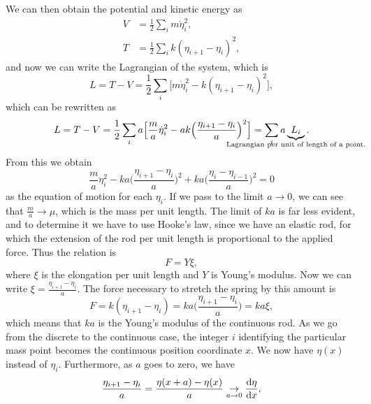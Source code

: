 \documentclass{article}
\begin{document}
We can then obtain the potential and kinetic energy as
\begin{subequations}
    \begin{align}
        V &= \frac{1}{2}\sum_i m\dot{\eta}_i^2,\\
        T & = \frac{1}{2}\sum_i k(\eta_{i+1} - \eta_i)^2,
    \end{align}
\end{subequations}
and now we can write the Lagrangian of the system, which is
\begin{equation*}
    L = T - V = \frac{1}{2} \sum_i  \Big[ m \dot{\eta}_i^2 - k(\eta_{i+1} - \eta_i)^2\Big],
\end{equation*}
which can be rewritten as
\begin{equation}
    L = T - V = \frac{1}{2} \sum_i a\Big[ \frac{m}{a}\dot{\eta}_i^2 - ak\Big(\frac{\eta_{i+1} - \eta_i}{a}\Big)^2 \Big] = \sum_i a\underbrace{L_i}_{\mathclap{\text{Lagrangian per unit of length of a point.}}}.
\end{equation}
From this we obtain
\begin{equation*}
    \frac{m}{a} \ddot{\eta}_i^2 -ka \Big(\frac{\eta_{i+1} - \eta_i}{a}\Big)^2 + ka \Big(\frac{\eta_{i} - \eta_{i-1}}{a}\Big)^2 =0
\end{equation*}
as the equation of motion for each $\eta_i$.
If we pass to the limit $a\rightarrow 0$, we can see that $\frac{m}{a}\rightarrow \mu$, which is the mass per unit length.
The limit of $ka$ is far less evident, and to determine it we have to use Hooke's law, since we have an elastic rod,
for which the extension of the rod per unit length is proportional to the applied force. Thus the relation is
\begin{equation}
    F= Y \xi,
\end{equation}
where $\xi$ is the elongation per unit length and $Y$ is Young's modulus. Now we can write $\xi = \frac{\eta_{i+1} - \eta_i}{a}$. The force necessary to
stretch the spring by this amount is
\begin{equation*}
    F = k(\eta_{i+1} - \eta_i) = ka \Big(\frac{\eta_{i+1} - \eta_i}{a}\Big) = ka \xi,
\end{equation*}
which means that $ka$ is the Young's modulus of the continuous rod. As we go from the discrete to the continuous case, the integer $i$ identifying 
the particular mass point becomes the continuous position coordinate $x$. We now have $\eta(x)$ instead of $\eta_i$.
Furthermore, as $a$ goes to zero, we have
\begin{equation*}
    \frac{\eta_{i+1} - \eta_i}{a} = \frac{\eta(x+a) - \eta(x)}{a} \underset{a \rightarrow 0}\rightarrow \dv{\eta}{x},
\end{equation*}
\end{document}
